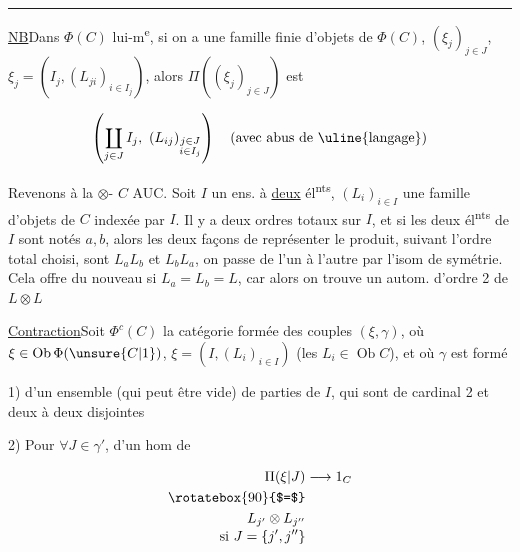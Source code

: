 \rule{2.3em}{1.4pt}

\uline{NB}\quad Dans $\Phi(C)$ lui-m\textsuperscript{e}, si on a une famille finie d'objets de $\Phi(C)$, $(\xi_j)_{j\in J}$, $\xi_j=(I_j,(L_{ji})_{i\in I_j})$, alors $\Pi((\xi_j)_{j\in J})$ est

\[\left(\coprod_{j\in J}I_j,\ (L_{ij})_{\substack{j\in J\\i\in I_j}}\right)\quad\text{(avec abus de \uline{langage})}\]

Revenons à la $\otimes$- $C$ AUC. Soit $I$ un ens.  à \uline{deux} él\textsuperscript{nts}, $(L_i)_{i\in I}$ une famille d'objets de $C$ indexée par $I$. Il y a deux ordres totaux sur $I$, et si les deux él\textsuperscript{nts} de $I$ sont notés $a,b$, alors les deux façons de représenter le produit, suivant l'ordre total choisi, sont $L_a L_b$ et $L_b L_a$, on passe de l'un à l'autre par l'isom de symétrie. Cela offre  du nouveau si $L_a=L_b=L$, car alors on trouve un  autom. d'ordre 2 de $L\otimes L$ 


\uline{Contraction}\quad Soit $\Phi^c(C)$ la catégorie formée des  couples $(\xi,\gamma)$, où $\xi\in\operatorname{Ob}\Phi(\unsure{C|1})$, $\xi=(I,(L_i)_{i\in I})$ (les $L_i\in\operatorname{Ob}C$), et où $\gamma$ est formé

1) d'un ensemble  (qui peut être vide) de parties de $I$, qui sont  de cardinal 2 et deux à deux disjointes

2) Pour $\forall J\in\gamma'$, d'un hom de

\[
\begin{aligned}\Pi(\xi|J)&\longrightarrow1_C\\
\rotatebox{90}{$=$}&\\
L_{j'}\otimes L_{j''}&\\[-2pt]\text{si }J=\{j',j''\}&
\end{aligned}
\]



